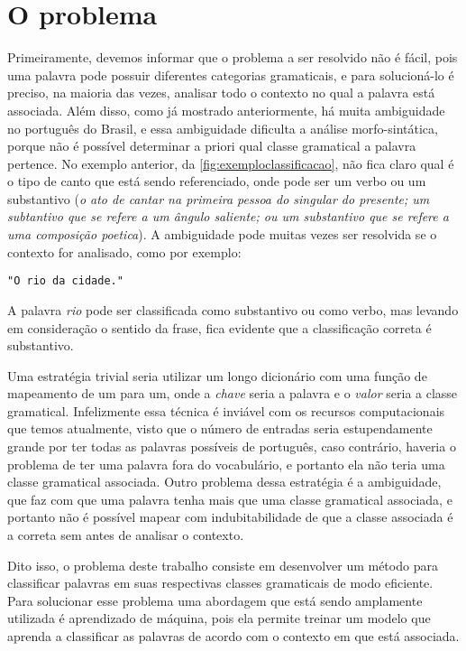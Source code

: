 \chapter{O problema}\label{oproblema}

Primeiramente, devemos informar que o problema a ser resolvido não é fácil, pois uma palavra pode possuir diferentes categorias gramaticais, e para solucioná-lo é  preciso, na maioria das vezes, analisar todo o contexto no qual a palavra está associada. Além disso, como já mostrado anteriormente, há muita ambiguidade no português do Brasil, e essa ambiguidade dificulta a análise morfo-sintática, porque não é possível determinar a priori qual classe gramatical a palavra pertence. No exemplo anterior, da \autoref{fig:exemploclassificacao}, não fica claro qual é o tipo de canto que está sendo referenciado, onde pode ser um verbo ou um substantivo (\textit{o ato de cantar na primeira pessoa do singular do presente; um subtantivo que se refere a um ângulo saliente; ou um substantivo que se refere a uma composição poetica}). A ambiguidade pode muitas vezes ser resolvida se o contexto for analisado, como por exemplo:

\begin{center}
\texttt{"O rio da cidade."}
\end{center}

A palavra \textit{rio} pode ser classificada como substantivo ou como verbo, mas levando em consideração o sentido da frase, fica evidente que a classificação correta é substantivo.

Uma estratégia trivial seria utilizar um longo dicionário com uma função de mapeamento de um para um, onde a \textit{chave} seria a palavra e o \textit{valor} seria a classe gramatical. Infelizmente essa técnica é inviável com os recursos computacionais que temos atualmente, visto que o número de entradas seria estupendamente grande por ter todas as palavras possíveis de português, caso contrário, haveria o
problema de ter uma palavra fora do vocabulário, e portanto ela não teria uma classe gramatical associada. Outro problema dessa estratégia é a ambiguidade, que faz com que uma palavra tenha mais que uma classe gramatical associada, e portanto não é possível mapear com indubitabilidade de que a classe associada é a correta sem antes de analisar o contexto.

Dito isso, o problema deste trabalho consiste em desenvolver um método para classificar palavras em suas respectivas classes gramaticais de modo eficiente. Para solucionar esse problema uma abordagem que está sendo amplamente utilizada é aprendizado de máquina, pois ela permite treinar um modelo que aprenda a classificar as palavras de acordo com o contexto em que está associada. 

